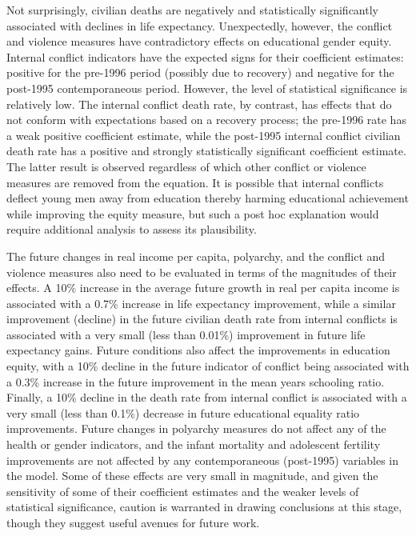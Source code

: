 \documentclass[12pt]{article}
\begin{document}
Not surprisingly, civilian deaths are negatively and statistically significantly associated with declines in life expectancy. Unexpectedly, however, the conflict and violence measures have contradictory effects on educational gender equity. Internal conflict indicators have the expected signs for their coefficient estimates: positive for the pre-1996 period (possibly due to recovery) and negative for the post-1995 contemporaneous period. However, the level of statistical significance is relatively low. The internal conflict death rate, by contrast, has effects that do not conform with expectations based on a recovery process; the pre-1996 rate has a weak positive coefficient estimate, while the post-1995 internal conflict civilian death rate has a positive and strongly statistically significant coefficient estimate. The latter result is observed regardless of which other conflict or violence measures are removed from the equation. It is possible that internal conflicts deflect young men away from education thereby harming educational achievement while improving the equity measure, but such a post hoc explanation would require additional analysis to assess its plausibility.

The future changes in real income per capita, polyarchy, and the conflict and violence measures also need to be evaluated in terms of the magnitudes of their effects. A 10\% increase in the average future growth in real per capita income is associated with a  0.7\% increase in life expectancy improvement, while a similar improvement (decline) in the future civilian death rate from internal conflicts is associated with a  very small (less than 0.01\%) improvement in future life expectancy gains.  Future conditions also affect the improvements in education equity, with a 10\% decline in the future indicator of conflict being associated with  a 0.3\% increase in the future improvement in the mean years schooling ratio. Finally, a 10\% decline in the death rate from internal conflict is associated with a very small (less than 0.1\%) decrease in future educational equality ratio improvements. Future changes in polyarchy measures do not affect any of the health or gender indicators, and the infant mortality and adolescent fertility improvements are not affected by any contemporaneous (post-1995) variables in the model. Some of these effects are very small in magnitude, and given the sensitivity of some of their coefficient estimates and the weaker levels of statistical significance, caution is warranted in drawing conclusions at this stage, though they suggest useful avenues for future work.
\end{document}
